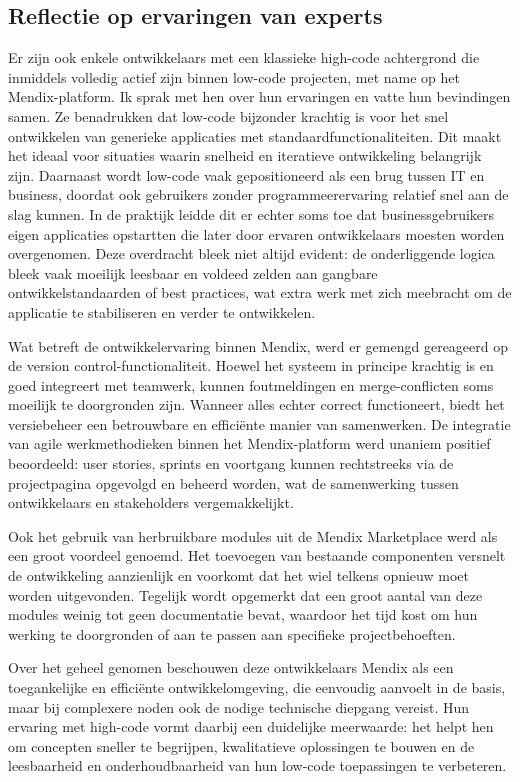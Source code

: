 \subsection{Reflectie op ervaringen van experts}
Er zijn ook enkele ontwikkelaars met een klassieke high-code achtergrond die inmiddels volledig actief zijn binnen low-code projecten, met name op het Mendix-platform. Ik sprak met hen over hun ervaringen en vatte hun bevindingen samen. 
Ze benadrukken dat low-code bijzonder krachtig is voor het snel ontwikkelen van generieke applicaties met standaardfunctionaliteiten. Dit maakt het ideaal voor situaties waarin snelheid en iteratieve ontwikkeling belangrijk zijn. Daarnaast wordt low-code vaak gepositioneerd als een brug tussen IT en business, doordat ook gebruikers zonder programmeerervaring relatief snel aan de slag kunnen. In de praktijk leidde dit er echter soms toe dat businessgebruikers eigen applicaties opstartten die later door ervaren ontwikkelaars moesten worden overgenomen. Deze overdracht bleek niet altijd evident: de onderliggende logica bleek vaak moeilijk leesbaar en voldeed zelden aan gangbare ontwikkelstandaarden of best practices, wat extra werk met zich meebracht om de applicatie te stabiliseren en verder te ontwikkelen.

Wat betreft de ontwikkelervaring binnen Mendix, werd er gemengd gereageerd op de version control-functionaliteit. Hoewel het systeem in principe krachtig is en goed integreert met teamwerk, kunnen foutmeldingen en merge-conflicten soms moeilijk te doorgronden zijn. Wanneer alles echter correct functioneert, biedt het versiebeheer een betrouwbare en efficiënte manier van samenwerken. De integratie van agile werkmethodieken binnen het Mendix-platform werd unaniem positief beoordeeld: user stories, sprints en voortgang kunnen rechtstreeks via de projectpagina opgevolgd en beheerd worden, wat de samenwerking tussen ontwikkelaars en stakeholders vergemakkelijkt.

Ook het gebruik van herbruikbare modules uit de Mendix Marketplace werd als een groot voordeel genoemd. Het toevoegen van bestaande componenten versnelt de ontwikkeling aanzienlijk en voorkomt dat het wiel telkens opnieuw moet worden uitgevonden. Tegelijk wordt opgemerkt dat een groot aantal van deze modules weinig tot geen documentatie bevat, waardoor het tijd kost om hun werking te doorgronden of aan te passen aan specifieke projectbehoeften. 

Over het geheel genomen beschouwen deze ontwikkelaars Mendix als een toegankelijke en efficiënte ontwikkelomgeving, die eenvoudig aanvoelt in de basis, maar bij complexere noden ook de nodige technische diepgang vereist. Hun ervaring met high-code vormt daarbij een duidelijke meerwaarde: het helpt hen om concepten sneller te begrijpen, kwalitatieve oplossingen te bouwen en de leesbaarheid en onderhoudbaarheid van hun low-code toepassingen te verbeteren.

